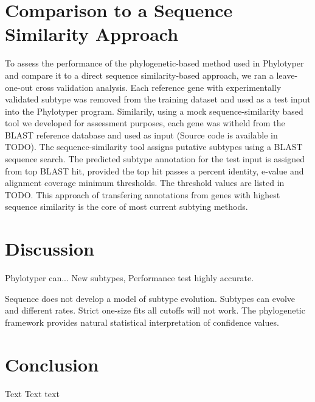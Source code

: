 \documentclass{bioinfo}
\begin{document}
\section{Comparison to a Sequence Similarity Approach}

To assess the performance of the phylogenetic-based method used in Phylotyper and compare it to a direct sequence similarity-based approach, we ran a leave-one-out cross validation analysis. 
Each reference gene with experimentally validated subtype was removed from the training dataset and used as a test input into the Phylotyper program. 
Similarily, using a mock sequence-similarity based tool we developed for assessment purposes, each gene was witheld from the BLAST reference database and used as input (Source code is available in TODO).
The sequence-similarity tool assigns putative subtypes using a BLAST sequence search.  
The predicted subtype annotation for the test input is assigned from top BLAST hit, provided the top hit passes a percent identity, e-value and alignment coverage minimum thresholds.  
The threshold values are listed in TODO.
This approach of transfering annotations from genes with highest sequence similarity is the core of most current subtying methods.


\section{Discussion}

Phylotyper can...
New subtypes,
Performance test highly accurate.

Sequence does not develop a model of subtype evolution. 
Subtypes can evolve and different rates. 
Strict one-size fits all cutoffs will not work.  
The phylogenetic framework provides natural statistical interpretation of confidence values.



%
%


\section{Conclusion}

Text Text text\vspace*{-10pt}
\end{document}
